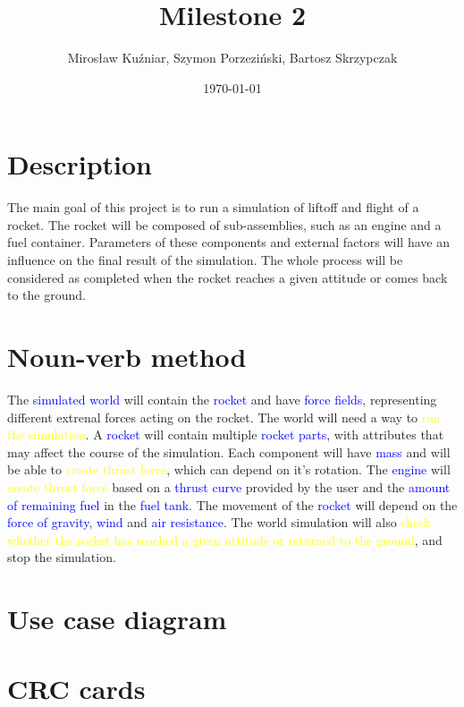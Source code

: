 \documentclass{article}
\title{Milestone 2}
\author{Mirosław Kuźniar, Szymon Porzeziński, Bartosz Skrzypczak }
\date{\today}
\begin{document}
\maketitle

\section{Description}
The main goal of this project is to run a simulation of liftoff and flight of a rocket. The rocket will be composed of sub-assemblies, such as an engine and a fuel container. Parameters of these components and external factors will have an influence on the final result of the simulation. The whole process will be considered as completed when the rocket reaches a given attitude or comes back to the ground. 

\section{Noun-verb method}
The \textcolor{blue}{simulated world} will contain the \textcolor{blue}{rocket} and have \textcolor{blue}{force fields}, representing different extrenal forces acting on the rocket. The world will need a way to \textcolor{yellow}{run the simulation}. A \textcolor{blue}{rocket} will contain multiple \textcolor{blue}{rocket parts}, with attributes that may affect the course of the simulation. Each component will have \textcolor{blue}{mass} and will be able to \textcolor{yellow}{create thrust force}, which can depend on it's rotation. The \textcolor{blue}{engine} will \textcolor{yellow}{create thrust force} based on a \textcolor{blue}{thrust curve} provided by the user and the \textcolor{blue}{amount of remaining fuel} in the \textcolor{blue}{fuel tank}. The movement of the \textcolor{blue}{rocket} will depend on the \textcolor{blue}{force of gravity}, \textcolor{blue}{wind} and \textcolor{blue}{air resistance}. The world simulation will also \textcolor{yellow}{check whether the rocket has reached a given attitude or returned to the ground}, and stop the simulation.

\section{Use case diagram}

\section{CRC cards}
\end{document}
